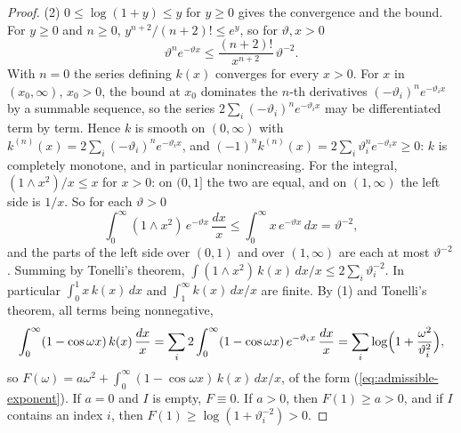 \begin{proof}
(2) $0 \le \log(1 + y) \le y$ for $y \ge 0$ gives the convergence and the bound. For $y \ge 0$ and
$n \ge 0$, $y^{n+2}/(n+2)! \le e^y$, so for $\vartheta, x > 0$
\[
  \vartheta^ne^{-\vartheta x} \le \frac{(n+2)!}{x^{n+2}}\,\vartheta^{-2} .
\]
With $n = 0$ the series defining $k(x)$ converges for every $x > 0$. For $x$ in $(x_0, \infty)$,
$x_0 > 0$, the bound at $x_0$ dominates the $n$-th derivatives $(-\vartheta_i)^ne^{-\vartheta_ix}$
by a summable sequence, so the series $2\sum_i(-\vartheta_i)^ne^{-\vartheta_ix}$ may be
differentiated term by term. Hence $k$ is smooth on $(0, \infty)$ with
$k^{(n)}(x) = 2\sum_i(-\vartheta_i)^ne^{-\vartheta_ix}$, and $(-1)^nk^{(n)}(x) =
2\sum_i\vartheta_i^ne^{-\vartheta_ix} \ge 0$: $k$ is completely monotone, and in particular
nonincreasing. For the integral, $(1 \wedge x^2)/x \le x$ for $x > 0$: on $(0, 1]$ the two are
equal, and on $(1, \infty)$ the left side is $1/x$. So for each $\vartheta > 0$
\[
  \int_0^\infty(1 \wedge x^2)\,e^{-\vartheta x}\,\frac{dx}{x}
  \le \int_0^\infty x\,e^{-\vartheta x}\,dx = \vartheta^{-2},
\]
and the parts of the left side over $(0, 1)$ and over $(1, \infty)$ are each at most
$\vartheta^{-2}$. Summing by Tonelli's theorem,
$\int(1 \wedge x^2)\,k(x)\,dx/x \le 2\sum_i\vartheta_i^{-2}$. In particular
$\int_0^1x\,k(x)\,dx$ and $\int_1^\infty k(x)\,dx/x$ are finite. By (1) and Tonelli's theorem, all
terms being nonnegative,
\[
  \int_0^\infty(1 - \cos\omega x)\,k(x)\,\frac{dx}{x}
  = \sum_i2\int_0^\infty(1 - \cos\omega x)\,e^{-\vartheta_ix}\,\frac{dx}{x}
  = \sum_i\log\Bigl(1 + \frac{\omega^2}{\vartheta_i^2}\Bigr),
\]
so $F(\omega) = a\omega^2 + \int_0^\infty(1 - \cos\omega x)\,k(x)\,dx/x$, of the form
(\ref{eq:admissible-exponent}). If $a = 0$ and $I$ is empty, $F \equiv 0$. If $a > 0$, then
$F(1) \ge a > 0$, and if $I$ contains an index $i$, then $F(1) \ge \log(1 + \vartheta_i^{-2}) > 0$.
\end{proof}

